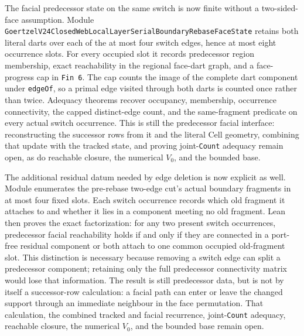 \documentclass[11pt]{article}
\theoremstyle{definition}
\begin{document}
The facial predecessor state on the same switch is now finite without a
two-sided-face assumption.  Module
\texttt{GoertzelV24ClosedWebLocalLayerSerialBoundaryRebaseFaceState}
retains both literal darts over each of the at most four switch edges, hence at
most eight occurrence slots.  For every occupied slot it records predecessor
region membership, exact reachability in the regional face-dart graph, and a
face-progress cap in \texttt{Fin 6}.  The cap counts the image of the complete
dart component under \texttt{edgeOf}, so a primal edge visited through both
darts is counted once rather than twice.  Adequacy theorems recover occupancy,
membership, occurrence connectivity, the capped distinct-edge count, and the
same-fragment predicate on every actual switch occurrence.  This is still the
predecessor facial interface: reconstructing the successor rows from it and
the literal Cell geometry, combining that update with the tracked state, and
proving joint-\texttt{Count} adequacy remain open, as do reachable closure,
the numerical $V_0$, and the bounded base.

The additional residual datum needed by edge deletion is now explicit as
well.  Module
enumerates the pre-rebase two-edge cut's actual boundary fragments in at most
four fixed slots.  Each switch occurrence records which old fragment it
attaches to and whether it lies in a component meeting no old fragment.  Lean
then proves the exact factorization: for any two present switch occurrences,
predecessor facial reachability holds if and only if they are connected in a
port-free residual component or both attach to one common occupied old-fragment
slot.  This distinction is necessary because removing a switch edge can split
a predecessor component; retaining only the full predecessor connectivity
matrix would lose that information.  The result is still predecessor data,
but is not by itself a successor-row calculation: a facial path can enter or
leave the changed support through an immediate neighbour in the face
permutation.  That calculation, the combined tracked and facial recurrence,
joint-\texttt{Count} adequacy, reachable closure, the numerical $V_0$, and the
bounded base remain open.
\end{document}
